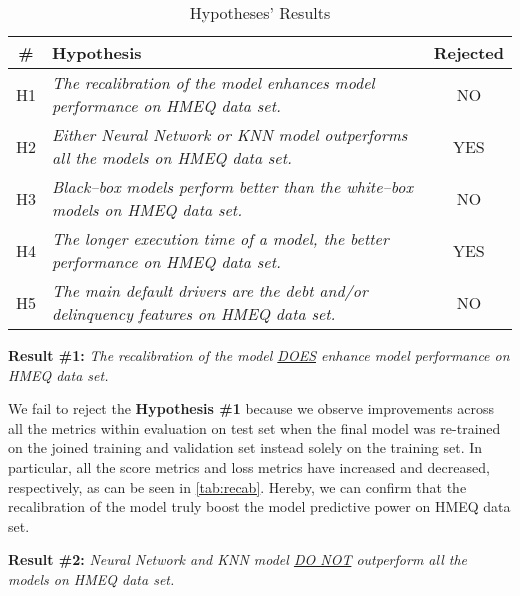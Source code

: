 \begin{table}[H]
    \small
    \setlength{\tabcolsep}{8pt}
    \centering
    \caption[Hypotheses' Results]{Hypotheses' Results}\label{tab:hypoconclusion}
    \renewcommand{\arraystretch}{1.5}
    \begin{tabular}{c p{10cm} c}
    \toprule
    \textbf{\#} & \textbf{Hypothesis} & \textbf{Rejected} \\
    \midrule
    \hline
    H1 & \textit{The recalibration of the model enhances model performance on HMEQ data set.} & NO \\
    H2 & \textit{Either Neural Network or KNN model outperforms all the models on HMEQ data set.} & YES \\
    H3 & \textit{Black--box models perform better than the white--box models on HMEQ data set.} & NO \\
    H4 & \textit{The longer execution time of a model, the better performance on HMEQ data set.} & YES \\
    H5 & \textit{The main default drivers are the debt and/or delinquency features on HMEQ data set.} & NO \\
    \hline
    \bottomrule
    \end{tabular}
    \vspace{0.35em}
    
    \vspace{-1em}
\end{table}


\noindent \textbf{Result \#1:} \textit{The recalibration of the model \underline{DOES} enhance model performance on HMEQ data set.}

We fail to reject the \textbf{Hypothesis \#1} because we observe improvements across all the metrics within evaluation on test set when the final model was re-trained on the joined training and validation set instead solely on the training set.
In particular, all the score metrics and loss metrics have increased and decreased, respectively, as can be seen in \autoref{tab:recab}. Hereby, we can confirm that the recalibration of the model truly boost the model predictive power on HMEQ data set.

\vspace{0.3cm}

\newpage
\noindent \textbf{Result \#2:} \textit{Neural Network and KNN model \underline{DO NOT} outperform all the models on HMEQ data set.}

